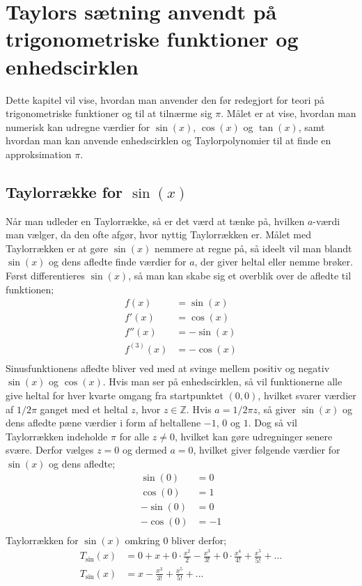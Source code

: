 \chapter{Taylors sætning anvendt på trigonometriske funktioner og enhedscirklen}
Dette kapitel vil vise, hvordan man anvender den før redegjort for teori på trigonometriske funktioner og til at tilnærme sig $\pi$. Målet er at vise, hvordan man numerisk kan udregne værdier for $\sin(x)$, $\cos(x)$ og $\tan(x)$, samt hvordan man kan anvende enhedscirklen og Taylorpolynomier til at finde en approksimation $\pi$.
\section{Taylorrække for $\sin(x)$}
Når man udleder en Taylorrække, så er det værd at tænke på, hvilken $a$-værdi man vælger, da den ofte afgør, hvor nyttig Taylorrækken er. Målet med Taylorrækken er at gøre $\sin(x)$ nemmere at regne på, så ideelt vil man blandt $\sin(x)$ og dens afledte finde værdier for $a$, der giver heltal eller nemme brøker. Først differentieres $\sin(x)$, så man kan skabe sig et overblik over de afledte til funktionen;
\begin{align*}
f(x) &= \sin(x) \\
f'(x) &= \cos(x) \\
f''(x) &= -\sin(x) \\
f^{(3)}(x) &= -\cos(x) \\
\end{align*}
Sinusfunktionens afledte bliver ved med at svinge mellem positiv og negativ $\sin(x)$ og $\cos(x)$. Hvis man ser på enhedscirklen, så vil funktionerne alle give heltal for hver kvarte omgang fra startpunktet $(0,0)$, hvilket svarer værdier af $1/2\pi$ ganget med et heltal $z$, hvor $z\in\mathbb{Z}$. Hvis $a=1/2\pi z$, så giver $\sin(x)$ og dens afledte pæne værdier i form af heltallene $-1$, $0$ og $1$. Dog så vil Taylorrækken indeholde $\pi$ for alle $z \neq 0$, hvilket kan gøre udregninger senere svære. Derfor vælges $z=0$ og dermed $a=0$, hvilket giver følgende værdier for $\sin(x)$ og dens afledte;
\begin{align*}
\sin(0) &= 0 \\
\cos(0) &= 1 \\
-\sin(0) &= 0 \\
-\cos(0) &= -1 \\
\end{align*}
Taylorrækken for $\sin(x)$ omkring $0$ bliver derfor;
\begin{align*}
T_{\sin} (x) &= 0+x+0 \cdot \frac{x^2}{2}-\frac{x^3}{3!}+0 \cdot \frac{x^4}{4!}+\frac{x^5}{5!}+... 
\\
T_{\sin} (x) &= x-\frac{x^3}{3!}+\frac{x^5}{5!}+... \\
\end{align*}
